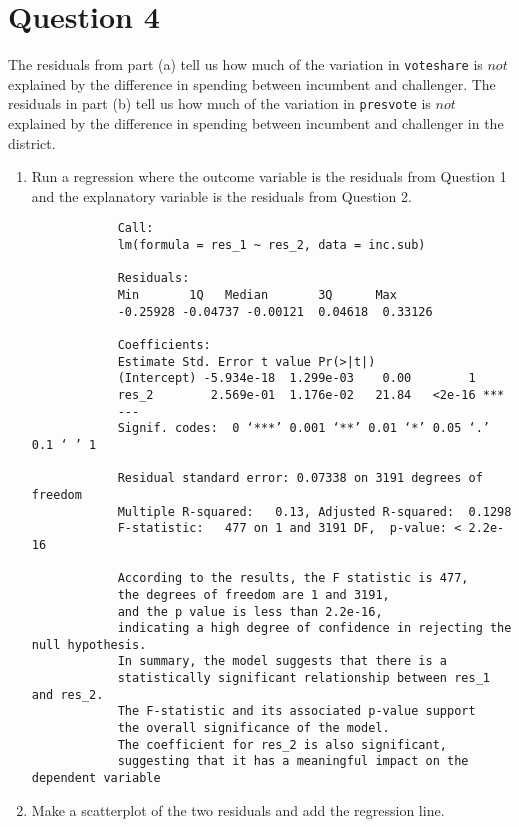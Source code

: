 \documentclass[12pt,letterpaper]{article}
\begin{document}
\section*{Question 4}
\noindent The residuals from part (a) tell us how much of the variation in \texttt{voteshare} is $not$ explained by the difference in spending between incumbent and challenger. The residuals in part (b) tell us how much of the variation in \texttt{presvote} is $not$ explained by the difference in spending between incumbent and challenger in the district.
	\begin{enumerate}
		\item Run a regression where the outcome variable is the residuals from Question 1 and the explanatory variable is the residuals from Question 2.	
	
		\vspace{.15cm}
		 
		\vspace{.15cm}
		\begin{footnotesize}
			\begin{verbatim}
			Call:
			lm(formula = res_1 ~ res_2, data = inc.sub)
			
			Residuals:
			Min       1Q   Median       3Q      Max 
			-0.25928 -0.04737 -0.00121  0.04618  0.33126 
			
			Coefficients:
			Estimate Std. Error t value Pr(>|t|)    
			(Intercept) -5.934e-18  1.299e-03    0.00        1    
			res_2        2.569e-01  1.176e-02   21.84   <2e-16 ***
			---
			Signif. codes:  0 ‘***’ 0.001 ‘**’ 0.01 ‘*’ 0.05 ‘.’ 0.1 ‘ ’ 1
			
			Residual standard error: 0.07338 on 3191 degrees of freedom
			Multiple R-squared:   0.13,	Adjusted R-squared:  0.1298 
			F-statistic:   477 on 1 and 3191 DF,  p-value: < 2.2e-16
			
			According to the results, the F statistic is 477, 
			the degrees of freedom are 1 and 3191,
			and the p value is less than 2.2e-16, 
			indicating a high degree of confidence in rejecting the null hypothesis.
			In summary, the model suggests that there is a 
			statistically significant relationship between res_1 and res_2. 
			The F-statistic and its associated p-value support 
			the overall significance of the model. 
			The coefficient for res_2 is also significant, 
			suggesting that it has a meaningful impact on the dependent variable 
				\end{verbatim}
			\end{footnotesize}	
		\item Make a scatterplot of the two residuals and add the regression line. 	
		\vspace{.15cm}
		 
		\vspace{.15cm}
		\begin{figure}[h!]\centering
			

\end{figure}
\end{enumerate}
\end{document}
